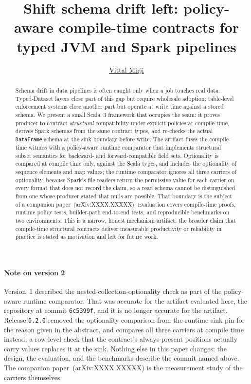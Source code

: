 \documentclass[sigplan,screen,nonacm]{acmart}
\title[Shift schema drift left]{Shift schema drift left: policy-aware compile-time contracts for typed JVM and Spark pipelines}
\author{\href{https://vitthalmirji.com/}{Vittal Mirji}}
\affiliation{
  \position{Staff Software Engineer \& Independent researcher}
  \country{ }
}
\newcommand{\companionpreprint}{arXiv:XXXX.XXXXX}
\begin{document}
\begin{abstract}
Schema drift in data pipelines is often caught only when a job touches real data. Typed-Dataset layers close part of this gap but require wholesale adoption; table-level enforcement systems close another part but operate at write time against a stored schema. We present a small Scala~3 framework that occupies the seam: it proves producer-to-contract \emph{structural} compatibility under explicit policies at compile time, derives Spark schemas from the same contract types, and re-checks the actual \texttt{DataFrame} schema at the sink boundary before write. The artifact fuses the compile-time witness with a policy-aware runtime comparator that implements structural subset semantics for backward- and forward-compatible field sets. Optionality is compared at compile time only, against the Scala types, and includes the optionality of sequence elements and map values; the runtime comparator ignores all three carriers of optionality, because Spark's file readers return the permissive value for each carrier on every format that does not record the claim, so a read schema cannot be distinguished from one whose producer stated that nulls are possible. That boundary is the subject of a companion paper~(\companionpreprint). Evaluation covers compile-time proofs, runtime policy tests, builder-path end-to-end tests, and reproducible benchmarks on two environments. This is a narrow, honest mechanism artifact; the broader claim that compile-time structural contracts deliver measurable productivity or reliability in practice is stated as motivation and left for future work.
\end{abstract}


\maketitle
\pagestyle{plain}

\paragraph*{Note on version 2}
Version~1 described the nested-collection-optionality check as part of the policy-aware runtime comparator. That was accurate for the artifact evaluated here, the repository at commit \texttt{6c5399f}, and it is no longer accurate for the artifact. Release \texttt{0.2.0} removed the optionality comparison from the runtime sink pin for the reason given in the abstract, and compares all three carriers at compile time instead; a row-level check that the contract's always-present positions actually carry values replaces it at the sink. Nothing else in this paper changes: the design, the evaluation, and the benchmarks describe the commit named above. The companion paper~(\companionpreprint) is the measurement study of the carriers themselves.
\end{document}
